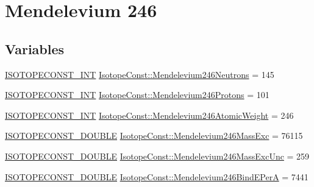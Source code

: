 \hypertarget{group___isotope_const-_mendelevium-_md246}{}\section{Mendelevium 246}
\label{group___isotope_const-_mendelevium-_md246}
\subsection*{Variables}
\begin{DoxyCompactItemize}
\item 
\mbox{\hyperlink{group___isotope_const-_macros_ga5f18360b3e99483a35c32d789e62621c}{I\+S\+O\+T\+O\+P\+E\+C\+O\+N\+S\+T\+\_\+\+I\+NT}} \mbox{\hyperlink{group___isotope_const-_mendelevium-_md246_ga9697254c260272365214b05225a0cc5a}{Isotope\+Const\+::\+Mendelevium246\+Neutrons}} = 145
\item 
\mbox{\hyperlink{group___isotope_const-_macros_ga5f18360b3e99483a35c32d789e62621c}{I\+S\+O\+T\+O\+P\+E\+C\+O\+N\+S\+T\+\_\+\+I\+NT}} \mbox{\hyperlink{group___isotope_const-_mendelevium-_md246_ga7c91f868084d2c52c7cfaa4d265d2c24}{Isotope\+Const\+::\+Mendelevium246\+Protons}} = 101
\item 
\mbox{\hyperlink{group___isotope_const-_macros_ga5f18360b3e99483a35c32d789e62621c}{I\+S\+O\+T\+O\+P\+E\+C\+O\+N\+S\+T\+\_\+\+I\+NT}} \mbox{\hyperlink{group___isotope_const-_mendelevium-_md246_ga3e63c9fe753b3cd0ed55de686f5f3e4d}{Isotope\+Const\+::\+Mendelevium246\+Atomic\+Weight}} = 246
\item 
\mbox{\hyperlink{group___isotope_const-_macros_ga8f45a7272ce02c0b4c65c44636ed719a}{I\+S\+O\+T\+O\+P\+E\+C\+O\+N\+S\+T\+\_\+\+D\+O\+U\+B\+LE}} \mbox{\hyperlink{group___isotope_const-_mendelevium-_md246_gab0b41d566eefbb4dc37602e8b4147799}{Isotope\+Const\+::\+Mendelevium246\+Mass\+Exc}} = 76115
\item 
\mbox{\hyperlink{group___isotope_const-_macros_ga8f45a7272ce02c0b4c65c44636ed719a}{I\+S\+O\+T\+O\+P\+E\+C\+O\+N\+S\+T\+\_\+\+D\+O\+U\+B\+LE}} \mbox{\hyperlink{group___isotope_const-_mendelevium-_md246_ga9306c3bd23912fbd348cb4c86ea97920}{Isotope\+Const\+::\+Mendelevium246\+Mass\+Exc\+Unc}} = 259
\item 
\mbox{\hyperlink{group___isotope_const-_macros_ga8f45a7272ce02c0b4c65c44636ed719a}{I\+S\+O\+T\+O\+P\+E\+C\+O\+N\+S\+T\+\_\+\+D\+O\+U\+B\+LE}} \mbox{\hyperlink{group___isotope_const-_mendelevium-_md246_ga8f39c73b89c87977a2e6c4bfcd1f0bfa}{Isotope\+Const\+::\+Mendelevium246\+Bind\+E\+PerA}} = 7441

\end{DoxyCompactItemize}
